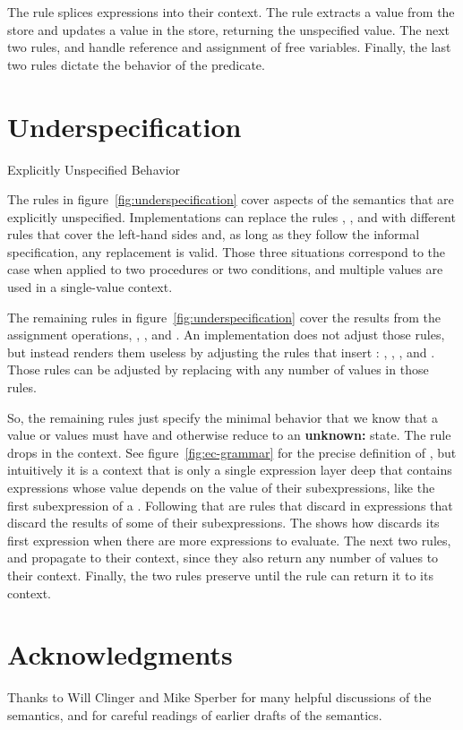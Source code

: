 The  rule splices \beginF{} expressions into
their context. The  rule extracts a value from the
store and  updates a value in the store, returning the
unspecified value. The next two rules,  and  handle reference and assignment of free variables. Finally, the last two rules dictate the behavior of the  predicate.

\section{Underspecification}\label{sec:semantics:underspecification}

\beginfig
\begin{center}

\end{center}
\caption{Explicitly Unspecified Behavior}\label{fig:underspecification}
\endfig

The rules in figure~\ref{fig:underspecification} cover aspects of the
semantics that are explicitly unspecified. Implementations can replace
the rules , ,  and with different rules that cover the left-hand sides and, as long as they follow the informal specification, any replacement is valid. Those three situations correspond to the case when  applied to two procedures or
two conditions, and multiple values are used in a single-value context.

The remaining rules in figure~\ref{fig:underspecification} cover the results from the assignment operations, , , and . An implementation does not adjust those rules, but instead renders them useless by adjusting the rules that insert : , , , and . Those rules can be adjusted by replacing  with any number of values in those rules.

So, the remaining rules just specify the minimal behavior that we know that a value or values must have and otherwise reduce to an \textbf{unknown:} state. The rule  drops  in the  context. See figure~\ref{fig:ec-grammar} for the precise definition of , but intuitively it is a context that is only a single expression layer deep that contains expressions whose value depends on the value of their subexpressions, like the first subexpression of a . Following that are rules that discard  in expressions that discard the results of some of their subexpressions. The  shows how  discards its first expression when there are more expressions to evaluate. The next two rules,  and  propagate  to their context, since they also return any number of values to their context. Finally, the two  rules preserve  until the rule  can return it to its context.

\section*{Acknowledgments}

Thanks to Will Clinger and Mike Sperber for many helpful discussions of the semantics, and for careful readings of earlier drafts of the semantics.

